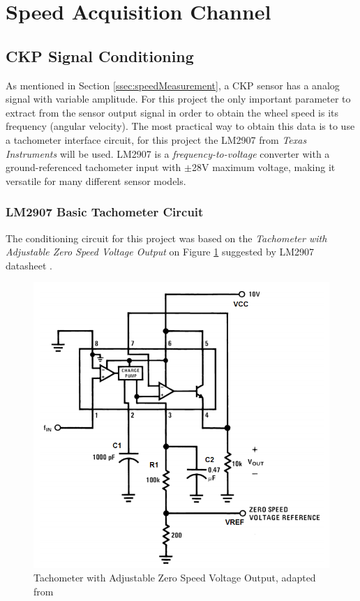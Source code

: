 \section{Speed Acquisition Channel}\label{sec:speed-acquisition-channel}

	\subsection{CKP Signal Conditioning}\label{ssec:ckp-signal-conditioning-circuit}

		As mentioned in Section \ref{ssec:speedMeasurement}, a CKP sensor has a analog signal with variable amplitude. For this project the only important parameter to extract from the sensor output signal in order to obtain the wheel speed is its frequency (angular velocity). The most practical way to obtain this data is to use a tachometer interface circuit, for this project the LM2907 from \textit{Texas Instruments} \cite{lm2907-datasheet} will be used. LM2907 is a \textit{frequency-to-voltage} converter with a ground-referenced tachometer input with $\pm$28V maximum voltage, making it versatile for many different sensor models.
		
		\subsubsection{LM2907 Basic Tachometer Circuit}\label{sssec:lm2907-basic-tachometer-circuit}
			The conditioning circuit for this project was based on the \textit{Tachometer with Adjustable Zero Speed Voltage Output} on Figure \ref{fig:lm2907-minimum-component-tachometer} suggested by LM2907 datasheet \cite{lm2907-datasheet}.

			\begin{figure}[htbp]
				\centering
					\includegraphics[scale=0.7]{figuras/fig-lm2907-minimum-component-tachometer.png}
				\caption{Tachometer with Adjustable Zero Speed Voltage Output, adapted from \cite{lm2907-minimum-component-tachometer}}
				\label{fig:lm2907-minimum-component-tachometer}
			\end{figure}

